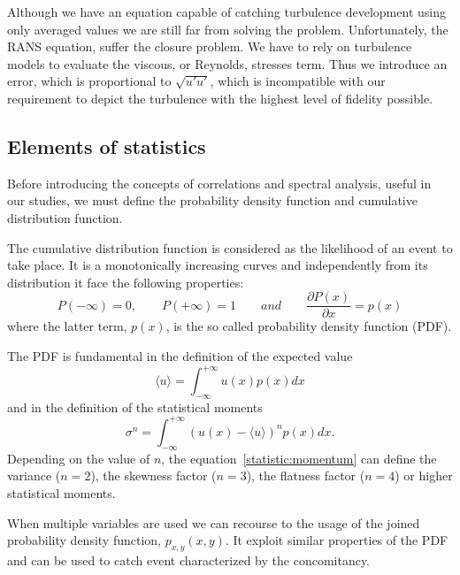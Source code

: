 \par
Although we have an equation capable of catching turbulence development using only averaged values we are still far from solving the problem. Unfortunately, the RANS equation, suffer the closure problem. We have to rely on turbulence models to evaluate the viscous, or Reynolds, stresses term. Thus we introduce an error, which is proportional to $\sqrt{u'u'}$, which is incompatible with our requirement to depict the turbulence with the highest level of fidelity possible.





\subsection{Elements of statistics}
Before introducing the concepts of correlations and spectral analysis, useful in our studies, we must define the probability density function and cumulative distribution function. \par
The cumulative distribution function is considered as the likelihood of an event to take place. It is a monotonically increasing curves and independently from its distribution it face the following properties:
\begin{equation*}
P(-\infty) = 0, \qquad P(+\infty) = 1 \qquad and \qquad \frac{\partial P(x)}{\partial x} = p(x)
\end{equation*}
where the latter term, $p(x)$, is the so called probability density function (PDF).
\par
The PDF is fundamental in the definition of the expected value
\begin{equation}
\langle u \rangle = \int_{-\infty}^{+\infty} u(x) p(x) dx
\end{equation}
and in the definition of the statistical moments
\begin{equation}
\sigma^{n} = \int_{-\infty}^{+\infty} (u(x) - \langle u \rangle)^{n} p(x)dx.
\label{statistic:momentum}
\end{equation}
Depending on the value of $n$, the equation~\ref{statistic:momentum} can define the variance ($n=2$), the skewness factor ($n=3$), the flatness factor ($n=4$) or higher statistical moments.
\par
When multiple variables are used we can recourse to the usage of the joined probability density function, $p_{x,y}(x,y)$. It exploit similar properties of the PDF and can be used to catch event characterized by the concomitancy. 
\par
